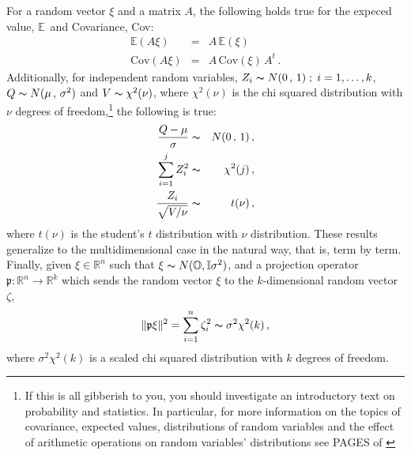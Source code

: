 For a random vector $\xi$ and a matrix $A$, the following holds true for the expeced value, $\mathbb{E}\,$ and Covariance,  \mbox{Cov}: 
\begin{eqnarray} \label{Mean}
\mathbb{E}( A \xi) &=& A \, \mathbb{E}(\xi) \\ \label{Cov} \mbox{Cov}( A \xi) & = &A\, \mbox{Cov}(\xi) \,A^t \,.
\end{eqnarray}
Additionally, for independent random variables, $Z_i \thicksim N(0\,,\,1)\; ;\;  i = 1, \dots , k $,  $Q \thicksim N(\mu\,,\, \sigma^2)$ and $V \thicksim \chi^2(\nu)$, where $\chi^2(\nu)$ is the chi squared distribution with $\nu$ degrees of freedom,\footnote{If this is all gibberish to you, you should investigate an introductory text on probability and statistics. In particular, for more information on the topics of covariance, expected values, distributions of random variables and the effect of arithmetic operations on random variables' distributions see PAGES of \cite{Intro}} the following is true:
\begin{eqnarray}
\frac{Q - \mu}{\sigma} & \thicksim & N(0\,,\,1)\,, \\
\displaystyle\sum_{i=1}^{j} Z_i^2 & \thicksim & \chi^2(j)\,, \label{chisquared} \\
\frac{Z_i}{ \sqrt{  V/ \nu } }& \thicksim& t(\nu)\,, \label{studentst} \\
\end{eqnarray}
where $t(\nu)$ is the student's $t$ distribution with $\nu$ distribution. These results generalize to the multidimensional case in the natural way, that is, term by term. Finally, given $\xi \in \mathbb{R}^n$ such that $\xi \thicksim N(\mathbb{O}, \mathbb{I}\sigma^2)$, and a projection operator  $\mathfrak{p} : \mathbb{R}^n \rightarrow \mathbb{R}^k$ which sends the random vector $\xi$ to the $k$-dimensional random vector $\zeta$,
\begin{eqnarray} \| \mathfrak{p} \xi \|^2 = \displaystyle\sum_{i=1}^{n} \zeta_i^2 \thicksim \sigma^2 \chi^2(k) \,, \label{scaledchi} \end{eqnarray}
where $\sigma^2 \chi^2(k)$ is a scaled chi squared distribution with $k$ degrees of freedom. 

